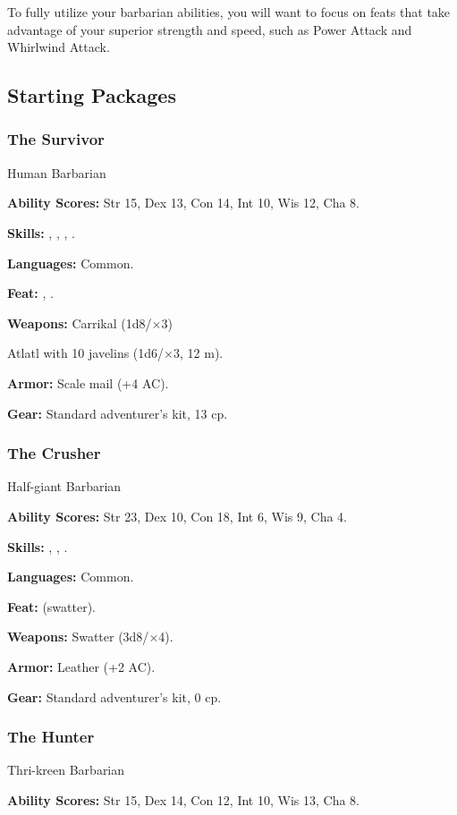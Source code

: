 To fully utilize your barbarian abilities, you will want to focus on feats that take advantage of your superior strength and speed, such as Power Attack and Whirlwind Attack.


\subsection{Starting Packages}
\subsubsection{The Survivor}
Human Barbarian

\textbf{Ability Scores:} Str 15, Dex 13, Con 14, Int 10, Wis 12, Cha 8.

\textbf{Skills:} , , , .

\textbf{Languages:} Common.

\textbf{Feat:} , .

\textbf{Weapons:} Carrikal (1d8/$\times$3)

Atlatl with 10 javelins (1d6/$\times$3, 12 m).

\textbf{Armor:} Scale mail (+4 AC).

\textbf{Gear:} Standard adventurer's kit, 13 cp.

\subsubsection{The Crusher}
Half-giant Barbarian

\textbf{Ability Scores:} Str 23, Dex 10, Con 18, Int 6, Wis 9, Cha 4.

\textbf{Skills:} , , .

\textbf{Languages:} Common.

\textbf{Feat:}  (swatter).

\textbf{Weapons:} Swatter (3d8/$\times$4).

\textbf{Armor:} Leather (+2 AC).

\textbf{Gear:} Standard adventurer's kit, 0 cp.

\subsubsection{The Hunter}
Thri-kreen Barbarian

\textbf{Ability Scores:} Str 15, Dex 14, Con 12, Int 10, Wis 13, Cha 8.

